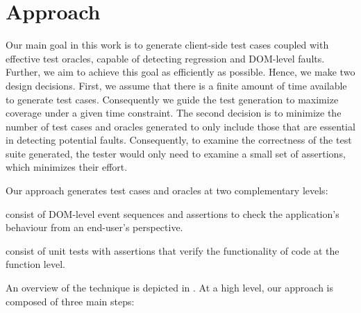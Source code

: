 \section{Approach} \label{Sec:approach}
Our main goal in this work is to generate client-side test cases coupled with
effective test oracles, capable of detecting regression \javascript and DOM-level faults. 
Further, we aim to achieve this goal as efficiently as possible. Hence, we make two design decisions. First, we assume that there is a finite amount of time available to generate test cases. Consequently we guide the test generation  to maximize coverage under a given time constraint. 
The second decision is to minimize the number of test cases and oracles generated to only include those that are essential in detecting potential faults. %
Consequently, to examine the correctness of the test suite generated, the tester would only need to examine a small set of assertions, which minimizes their effort.

Our approach generates test cases and oracles at two complementary levels:
\begin{description}
\item[DOM-level event-based tests] consist of DOM-level event sequences and assertions to check the application's behaviour from an end-user's perspective. 
\item[Function-level unit tests]  consist of unit tests with assertions that verify the functionality of \javascript code at the function level.
\end{description}

An overview of the technique is depicted in . 
At a high level, our approach is composed of three main steps:

